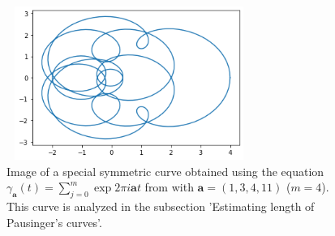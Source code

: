 \begin{figure}[h!]
  \begin{center}
    \includegraphics[width=80mm, height=50mm]{Figuras/CurvaBuffon.png}\par
    \caption{Image of a special symmetric curve obtained using the equation $ \gamma_{\textbf{a}}(t) = \sum_{j=0}^{m} \exp{2\pi i \textbf{a} t} $ from \cite{Pausinger.pdf} with $\textbf{a}=(1,3,4,11)$ ($m=4$). This curve is analyzed in the subsection 'Estimating length of Pausinger's curves'.}
    \label{fig:Pausinger}
  \end{center}
\end{figure}
